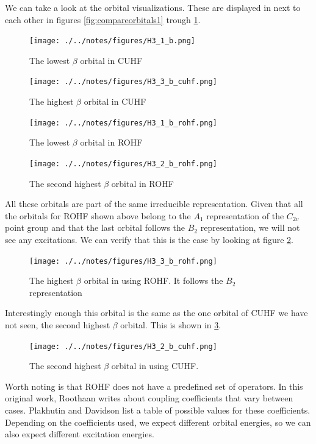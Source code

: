 \documentclass[twoside,twocolumn,9pt]{article}
\begin{document}
We can take a look at the orbital visualizations.  These are displayed in next to each other in figures \ref{fig:compareorbitals1}
trough \ref{fig:compareorbitals4}. \\
\begin{figure}[ht]
  \begin{minipage}[b]{0.5\linewidth}
    \texttt{[image: ./../notes/figures/H3\_1\_b.png]}
    \caption{The lowest $\beta$ orbital in CUHF}
    \label{fig:compareorbitals1}
  \end{minipage}
  \begin{minipage}[b]{0.5\linewidth}
    \texttt{[image: ./../notes/figures/H3\_3\_b\_cuhf.png]}
    \caption{The highest $\beta$ orbital in CUHF}
    \label{fig:compareorbitals2}
  \end{minipage}
  \begin{minipage}[b]{0.5\linewidth}
    \texttt{[image: ./../notes/figures/H3\_1\_b\_rohf.png]}
    \caption{The lowest $\beta$ orbital in ROHF}
    \label{fig:compareorbitals3}
  \end{minipage}
  \begin{minipage}[b]{0.5\linewidth}
    \texttt{[image: ./../notes/figures/H3\_2\_b\_rohf.png]}
    \caption{The second highest $\beta$ orbital in ROHF}
    \label{fig:compareorbitals4}
  \end{minipage}
\end{figure}
All these orbitals are part of the same irreducible representation. Given that all the orbitals for ROHF shown above belong to
the $A_1$ representation of the $C_{2v}$ point group and that the last orbital follows the $B_2$ representation, we will not see any excitations. We can verify that this is the case
by looking at figure \ref{fig:rohforbitalb2}.
\begin{figure}[h]
  \texttt{[image: ./../notes/figures/H3\_3\_b\_rohf.png]}
  \caption{The highest $\beta$ orbital in  using ROHF. It follows the $B_2$ representation}
  \label{fig:rohforbitalb2}
\end{figure}
Interestingly enough this orbital is the same as the one orbital of CUHF we have not seen, the second highest $\beta$ orbital. This is shown in
\ref{fig:cuhforbitalb2}.
\begin{figure}
  \texttt{[image: ./../notes/figures/H3\_2\_b\_cuhf.png]}
  \caption{The second highest $\beta$ orbital in  using CUHF.}
  \label{fig:cuhforbitalb2}
\end{figure}
Worth noting is that ROHF does not have a predefined set of operators. In this original work, Roothaan writes about coupling coefficients that vary between cases\cite{Roothaan1960}.
Plakhutin and Davidson list a table of possible values for these coefficients\cite{Plakhutin2014}. Depending on the coefficients used, we expect different orbital energies, so we can also
expect different excitation energies. \\
\end{document}
